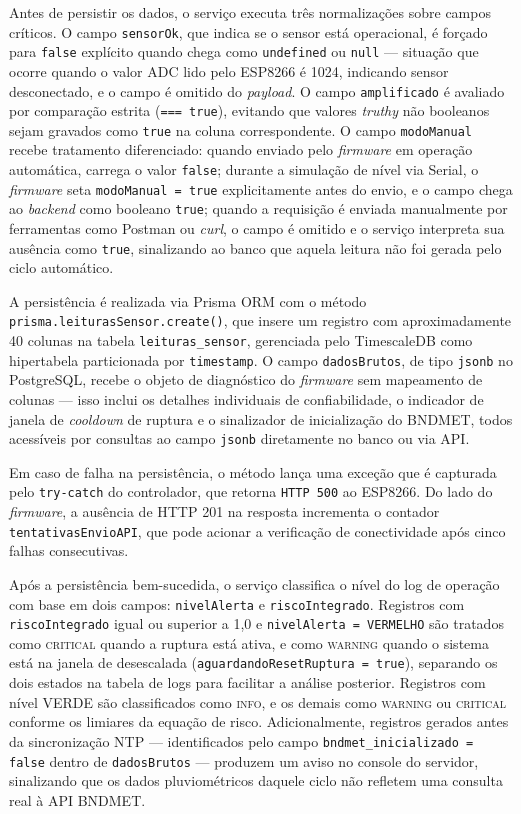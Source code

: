 Antes de persistir os dados, o serviço executa três normalizações
sobre campos críticos. O campo \texttt{sensorOk}, que indica se o
sensor está operacional, é forçado para \texttt{false} explícito
quando chega como \texttt{undefined} ou \texttt{null} — situação
que ocorre quando o valor ADC lido pelo ESP8266 é 1024, indicando
sensor desconectado, e o campo é omitido do \textit{payload}. O
campo \texttt{amplificado} é avaliado por comparação estrita
(\texttt{=== true}), evitando que valores \textit{truthy} não
booleanos sejam gravados como \texttt{true} na coluna correspondente.
O campo \texttt{modoManual} recebe tratamento diferenciado: quando
enviado pelo \textit{firmware} em operação automática, carrega o
valor \texttt{false}; durante a simulação de nível via Serial, o
\textit{firmware} seta \texttt{modoManual = true} explicitamente
antes do envio, e o campo chega ao \textit{backend} como booleano
\texttt{true}; quando a requisição é enviada manualmente por
ferramentas como Postman ou \textit{curl}, o campo é omitido e o
serviço interpreta sua ausência como \texttt{true}, sinalizando ao
banco que aquela leitura não foi gerada pelo ciclo automático.

A persistência é realizada via Prisma ORM com o método
\texttt{prisma.leiturasSensor.create()}, que insere um registro
com aproximadamente 40 colunas na tabela \texttt{leituras\_sensor},
gerenciada pelo TimescaleDB como hipertabela particionada por
\texttt{timestamp}. O campo \texttt{dadosBrutos}, de tipo
\texttt{jsonb} no PostgreSQL, recebe o objeto de diagnóstico do
\textit{firmware} sem mapeamento de colunas — isso inclui os
detalhes individuais de confiabilidade, o indicador de janela de
\textit{cooldown} de ruptura e o sinalizador de inicialização do
BNDMET, todos acessíveis por consultas ao campo \texttt{jsonb}
diretamente no banco ou via API.

Em caso de falha na persistência, o método lança uma exceção que
é capturada pelo \texttt{try-catch} do controlador, que retorna
\texttt{HTTP 500} ao ESP8266. Do lado do \textit{firmware}, a
ausência de HTTP 201 na resposta incrementa o contador
\texttt{tentativasEnvioAPI}, que pode acionar a verificação de
conectividade após cinco falhas consecutivas.

Após a persistência bem-sucedida, o serviço classifica o nível
do log de operação com base em dois campos: \texttt{nivelAlerta}
e \texttt{riscoIntegrado}. Registros com \texttt{riscoIntegrado}
igual ou superior a 1,0 e \texttt{nivelAlerta = VERMELHO} são
tratados como \textsc{critical} quando a ruptura está ativa, e
como \textsc{warning} quando o sistema está na janela de
desescalada (\texttt{aguardandoResetRuptura = true}), separando
os dois estados na tabela de logs para facilitar a análise
posterior. Registros com nível VERDE são classificados como
\textsc{info}, e os demais como \textsc{warning} ou
\textsc{critical} conforme os limiares da equação de risco.
Adicionalmente, registros gerados antes da sincronização NTP
--- identificados pelo campo \texttt{bndmet\_inicializado = false}
dentro de \texttt{dadosBrutos} --- produzem um aviso no console
do servidor, sinalizando que os dados pluviométricos daquele
ciclo não refletem uma consulta real à API BNDMET.

